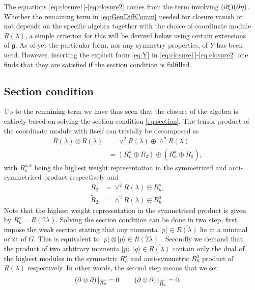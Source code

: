 The equations \eqref{eq:closure1}-\eqref{eq:closure2} comes from the term involving $(\partial\xi)(\partial\eta)$. Whether the remaining term in \eqref{eq:GenDiffComm} needed for closure vanish or not depends on the specific algebra together with the choice of coordinate module $R(\lambda)$, a simple criterion for this will be derived below using certain extensions of $\mathfrak{g}$. As of yet the particular form, nor any symmetry properties, of $Y$ has been used. However, inserting the explicit form \eqref{eq:Y} in \eqref{eq:closure1}-\eqref{eq:closure2} one finds that they are satisfied if the section condition is fulfilled. 

\subsection{Section condition}
Up to the remaining term we have thus seen that the closure of the algebra is entirely based on solving the section condition \eqref{eq:section}. The tensor product of the coordinate module with itself can trivially be decomposed as
\begin{equation}
    \begin{aligned}
        R(\lambda)\otimes R(\lambda) &= \vee^2 R(\lambda)\oplus \wedge^2R(\lambda)\\
        &= \left(R_h^s\oplus R_2\right)\oplus\left(R_h^a\oplus \tilde{R}_2\right),
    \end{aligned}
\end{equation}
with $R_h^{s,a}$ being the highest weight representation in the symmetrized and anti-symmetrised product respectively and
\begin{align}
    R_2 &= \vee^2 R(\lambda)\ominus R_h^s,\\
    \tilde{R}_2 &= \wedge^2R(\lambda)\ominus  R_h^a.
\end{align}
Note that the highest weight representation in the symmetrised product is given by $R_h^s=R(2\lambda)$. Solving the section condition can be done in two step, first impose the weak section stating that any momenta $|p\rangle\in \overbar{R(\lambda)}$ lie in a minimal orbit of $G$. This is equivalent to $|p\rangle\otimes|p\rangle \in \overbar{R(2\lambda)}$ \cite{Berman2013,Bossard2017}. Secondly we demand that the product of two arbitrary momenta $|p\rangle,|q\rangle\in\overbar{R(\lambda)}$ contain only the dual of the highest modules in the symmetric $R^s_h$ and anti-symmetric $R^a_h$ product of $R(\lambda)$ respectively. In other words, the second step means that we set 
\begin{equation}
    \left(\pd\otimes\pd\right)|_{\overbar{R_2}} = 0 \qquad \left(\pd\otimes\pd\right)|_{\overbar{\tilde{R}_2}} =0,
\end{equation}


